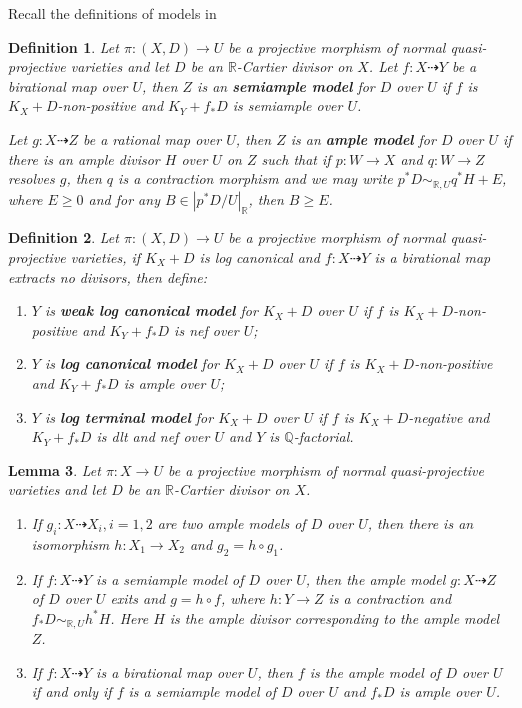 \documentclass[11pt]{amsart}
\newtheorem{defn}{Definition}[section]
\newtheorem{lem}[defn]{Lemma}
\begin{document}
Recall the definitions of models in \cite{BCHM10}
\begin{defn}
  \cite[Definition 3.6.5]{BCHM10} Let $ \pi:(X,D)\to U $ be a projective morphism of normal quasi-projective varieties and let $D$ be an $\mathbb{R}$-Cartier divisor on $X$. Let $ f:X\dashrightarrow Y $ be a birational map over $ U $, then $ Z $ is an \textbf{semiample model } for $ D $ over $ U $ if $ f $ is $ K_X+D $-non-positive and $ K_Y+f_*D $ is semiample over $ U $.

  Let $ g:X\dashrightarrow Z $ be a rational map over $ U $, then $ Z $ is an \textbf{ample model } for $ D $ over $ U $ if there is  an ample divisor $H$  over $U$  on $Z$  such that if $p:W \to X $ and $q:W \to Z $ resolves $g$, then $q$ is a contraction morphism and we may write $p^*D \sim_{\mathbb{R},U} q^*H+E$, where $E\geqslant 0$ and for any $B \in |p^*D/U|_{\mathbb{R}}$, then $B\geqslant E$.
\end{defn}
\begin{defn}\label{models}
  \cite[Definition 3.6.7]{BCHM10} Let $ \pi:(X,D)\to U $ be a projective morphism of normal quasi-projective varieties, if $ K_X+D $ is log canonical and $ f:X\dashrightarrow Y $ is a birational map extracts no divisors, then define:
  \begin{enumerate}
    \item $ Y $ is \textbf{weak log canonical model} for $ K_X+D $ over $ U $ if $ f $ is $ K_X+D $-non-positive and $ K_Y+f_*D $ is nef over $ U $;
    \item $ Y $ is \textbf{ log canonical model} for $ K_X+D $ over $ U $ if $ f $ is $ K_X+D $-non-positive and $ K_Y+f_*D $ is ample over $ U $;
    \item $ Y $ is \textbf{ log terminal model} for $ K_X+D $ over $ U $ if $ f $ is $ K_X+D $-negative and $ K_Y+f_*D $ is dlt and nef over $ U $ and $ Y $ is $ \mathbb{Q} $-factorial.
  \end{enumerate}
\end{defn}

\begin{lem}\cite[Lemma 3.6.6]{BCHM10}
  Let $\pi:X \to U$ be a projective morphism of normal quasi-projective varieties and let $D$ be an $\mathbb{R}$-Cartier divisor on $X$.
  \begin{enumerate}
    \item If $g_{i}:X \dashrightarrow X_{i}, i=1,2$ are two ample models of $D$ over $U$, then there is an isomorphism $h:X_{1}\to X_{2}$ and $g_{2}=h \circ g_{1}$.
    \item If $f:X \dashrightarrow Y$ is a semiample model of $D$ over $U$, then the ample model $g:X \dashrightarrow  Z$ of $D$ over $U$   exits and $g=h \circ f$, where $h:Y \to Z$ is a contraction and $f_*D \sim_{\mathbb{R},U}h^*H$. Here $H$ is the ample divisor corresponding to the ample model $Z$. 
  \item  If $f:X \dashrightarrow Y$ is a birational map over $U$, then $f$ is the ample model of $D$ over $U$ if and only if $f$ is a semiample model of $D$ over $U$ and $f_*D$ is ample over $U$.     
  \end{enumerate}
\end{lem}
\end{document}
